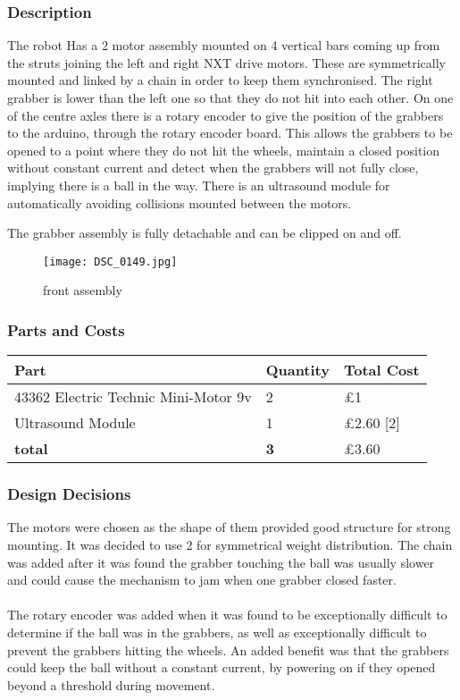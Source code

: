\documentclass[a4paper]{article}
\begin{document}
\subsubsection{Description}
The robot Has a 2 motor assembly mounted on 4 vertical bars coming up from the struts joining the left and right NXT drive motors. These are symmetrically mounted and linked by a chain in order to keep them synchronised. The right grabber is lower than the left one so that they do not hit into each other. On one of the centre axles there is a rotary encoder to give the position of the grabbers to the arduino, through the rotary encoder board. This allows the grabbers to be opened to a point where they do not hit the wheels, maintain a closed position without constant current and detect when the grabbers will not fully close, implying there is a ball in the way. There is an ultrasound module for automatically avoiding collisions mounted between the motors. 

The grabber assembly is fully detachable and can be clipped on and off. 
\begin{figure}[!ht]
\caption{front assembly}
\centering
\texttt{[image: DSC\_0149.jpg]}
\end{figure}

\subsubsection{Parts and Costs}

\begin{center}
\begin{tabular}{ | m{3cm} | m{3cm}| m{6cm} | }
\hline
\textbf{Part} & \textbf{Quantity} & \textbf{Total Cost} \\
\hline
43362 Electric Technic Mini-Motor 9v & 2 & £1 \\
\hline
Ultrasound Module       & 1 & £2.60 [2]\\
\hline
\textbf{total} & \textbf{3} & £3.60 \\
\hline
\end{tabular}
\end{center}

\subsubsection{Design Decisions}
The motors were chosen as the shape of them provided good structure for strong mounting. It was decided to use 2 for symmetrical weight distribution. The chain was added after it was found the grabber touching the ball was usually slower and could cause the mechanism to jam when one grabber closed faster.
\\ \\
The rotary encoder was added when it was found to be exceptionally difficult to determine if the ball was in the grabbers, as well as exceptionally difficult to prevent the grabbers hitting the wheels. An added benefit was that the grabbers could keep the ball without a constant current, by powering on if they opened beyond a threshold during movement. 
\end{document}
